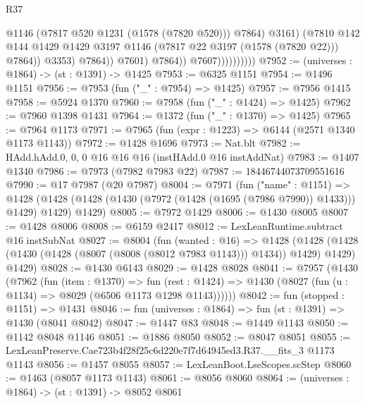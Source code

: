 \begin{lexlean}{R37}
\begin{coremodule}
                                          @1146
                                          (@7817 @520 @1231 (@1578 (@7820 @520)))
                                          @7864)
                                        @3161)
                                      (@7810
                                        @142
                                        @144
                                        @1429
                                        @1429
                                        @3197
                                        @1146
                                        (@7817 @22 @3197 (@1578 (@7820 @22)))
                                        @7864))
                                    @3353)
                                  @7864))
                              @7601)
                            @7864))
                        @7607))))))))))
@7952 := (universes : @1864) -> (st : @1391) -> @1425
@7953 := @6325 @1151
@7954 := @1496 @1151
@7956 := @7953 (fun ("_" : @7954) => @1425)
@7957 := @7956 @1415
@7958 := @5924 @1370
@7960 := @7958 (fun ("_" : @1424) => @1425)
@7962 := @7960 @1398 @1431
@7964 := @1372 (fun ("_" : @1370) => @1425)
@7965 := @7964 @1173
@7971 := @7965 (fun (expr : @1223) => @6144 (@2571 @1340 @1173 @1143))
@7972 := @1428 @1696
@7973 := Nat.blt
@7982 := HAdd.hAdd.{0, 0, 0} @16 @16 @16 (instHAdd.{0} @16 instAddNat)
@7983 := @1407 @1340
@7986 := @7973 (@7982 @7983 @22)
@7987 := 18446744073709551616
@7990 := @17 @7987 (@20 @7987)
@8004 := @7971
    (fun ("name" : @1151) =>
    @1428 (@1428 (@1428 (@1430 (@7972 (@1428 (@1695 (@7986 @7990)) @1433))) @1429) @1429) @1429)
@8005 := @7972 @1429
@8006 := @1430 @8005
@8007 := @1428 @8006
@8008 := @6159 @2417
@8012 := LexLeanRuntime.subtract @16 instSubNat
@8027 := @8004
    (fun (wanted : @16) =>
    @1428
      (@1428 (@1428 (@1430 (@1428 (@8007 (@8008 (@8012 @7983 @1143))) @1434)) @1429) @1429)
      @1429)
@8028 := @1430 @6143
@8029 := @1428 @8028
@8041 := @7957
    (@1430
      (@7962
        (fun (item : @1370) =>
        fun (rest : @1424) => @1430 (@8027 (fun (u : @1134) => @8029 (@6506 @1173 @1298 @1143))))))
@8042 := fun (stopped : @1151) => @1431
@8046 := fun (universes : @1864) => fun (st : @1391) => @1430 (@8041 @8042)
@8047 := @1447 @83
@8048 := @1449 @1143
@8050 := @1142 @8048 @1146
@8051 := @1886 @8050
@8052 := @8047 @8051
@8055 := LexLeanPreserve.Cae723b4f28f25c6d220e7f7d64945ed3.R37.__fits_3 @1173 @1143
@8056 := @1457 @8055
@8057 := LexLeanBoot.LseScopes.scStep
@8060 := @1463 (@8057 @1173 @1143)
@8061 := @8056 @8060
@8064 := (universes : @1864) -> (st : @1391) -> @8052 @8061

\end{coremodule}
\end{lexlean}
